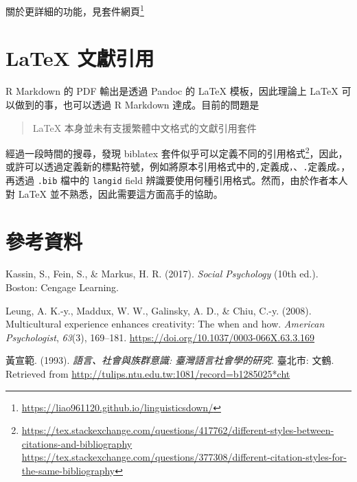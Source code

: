 \documentclass[oneside]{book}
\let\oldhref=\href
\renewcommand{\href}[2]{#2\footnote{\url{#1}}}
\renewcommand{\appendixname}{附錄}
\theoremstyle{definition}
\theoremstyle{definition}
\theoremstyle{definition}
\theoremstyle{remark}
\begin{document}
關於更詳細的功能，見\href{https://liao961120.github.io/linguisticsdown/}{套件網頁}

\cleardoublepage

\appendix \addcontentsline{toc}{chapter}{\appendixname}


\chapter{LaTeX 文獻引用}\label{latex-cite-pkg}

R Markdown 的 PDF 輸出是透過 Pandoc 的 LaTeX 模板，因此理論上 LaTeX
可以做到的事，也可以透過 R Markdown 達成。目前的問題是

\begin{quote}
LaTeX 本身並未有支援繁體中文格式的文獻引用套件
\end{quote}

經過一段時間的搜尋，發現 biblatex
套件似乎可以定義不同的引用格式\footnote{\url{https://tex.stackexchange.com/questions/417762/different-styles-between-citations-and-bibliography}\\
  \url{https://tex.stackexchange.com/questions/377308/different-citation-styles-for-the-same-bibliography}}，因此，或許可以透過定義新的標點符號，例如將原本引用格式中的\texttt{,}定義成\texttt{，}、\texttt{.}定義成\texttt{。}，再透過
\texttt{.bib} 檔中的 \texttt{langid} field
辨識要使用何種引用格式。然而，由於作者本人對 LaTeX
並不熟悉，因此需要這方面高手的協助。

\renewcommand{\href}{\oldhref}

\chapter*{參考資料}\label{references}

\hypertarget{refs}{}
\hypertarget{ref-kassin2017}{}
Kassin, S., Fein, S., \& Markus, H. R. (2017). \emph{Social Psychology}
(10th ed.). Boston: Cengage Learning.

\hypertarget{ref-leung2008}{}
Leung, A. K.-y., Maddux, W. W., Galinsky, A. D., \& Chiu, C.-y. (2008).
Multicultural experience enhances creativity: The when and how.
\emph{American Psychologist}, \emph{63}(3), 169--181.
\url{https://doi.org/10.1037/0003-066X.63.3.169}

\hypertarget{ref-huangxuanfan1993}{}
黃宣範. (1993). \emph{語言、社會與族群意識: 臺灣語言社會學的研究}.
臺北市: 文鶴. Retrieved from
\url{http://tulips.ntu.edu.tw:1081/record=b1285025*cht}
\end{document}
